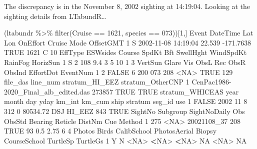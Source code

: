 \documentclass[
]{book}
\newenvironment{Shaded}{\begin{snugshade}}{\end{snugshade}}
\newcommand{\ConstantTok}[1]{\textcolor[rgb]{0.00,0.00,0.00}{#1}}
\newcommand{\DecValTok}[1]{\textcolor[rgb]{0.00,0.00,0.81}{#1}}
\newcommand{\ErrorTok}[1]{\textcolor[rgb]{0.64,0.00,0.00}{\textbf{#1}}}
\newcommand{\FloatTok}[1]{\textcolor[rgb]{0.00,0.00,0.81}{#1}}
\newcommand{\FunctionTok}[1]{\textcolor[rgb]{0.00,0.00,0.00}{#1}}
\newcommand{\NormalTok}[1]{#1}
\newcommand{\SpecialCharTok}[1]{\textcolor[rgb]{0.00,0.00,0.00}{#1}}
\newcommand{\StringTok}[1]{\textcolor[rgb]{0.31,0.60,0.02}{#1}}
\begin{document}
The discrepancy is in the November 8, 2002 sighting at 14:19:04. Looking at the sighting details from LTabundR\ldots{}

\begin{Shaded}
\begin{Highlighting}[]
\NormalTok{(ltabundr }\SpecialCharTok{\%\textgreater{}\%} \FunctionTok{filter}\NormalTok{(Cruise }\SpecialCharTok{==} \DecValTok{1621}\NormalTok{, species }\SpecialCharTok{==} \StringTok{\textquotesingle{}073\textquotesingle{}}\NormalTok{))[}\DecValTok{1}\NormalTok{,]}
\NormalTok{  Event            DateTime    Lat       Lon OnEffort Cruise Mode OffsetGMT}
\DecValTok{1}\NormalTok{     S }\DecValTok{2002{-}11{-}08} \DecValTok{14}\SpecialCharTok{:}\DecValTok{19}\SpecialCharTok{:}\DecValTok{04} \FloatTok{22.539} \SpecialCharTok{{-}}\FloatTok{171.7638}     \ConstantTok{TRUE}   \DecValTok{1621}\NormalTok{    C        }\DecValTok{10}
\NormalTok{  EffType ESWsides Course SpdKt Bft SwellHght WindSpdKt RainFog HorizSun}
\DecValTok{1}\NormalTok{       S        }\DecValTok{2}    \DecValTok{108}   \FloatTok{9.4}   \DecValTok{3}         \DecValTok{5}        \DecValTok{10}       \DecValTok{1}        \DecValTok{3}
\NormalTok{  VertSun Glare Vis ObsL Rec ObsR ObsInd EffortDot EventNum}
\DecValTok{1}       \DecValTok{2} \ConstantTok{FALSE}   \DecValTok{6}  \DecValTok{200} \DecValTok{073}  \DecValTok{208}   \SpecialCharTok{\textless{}}\ConstantTok{NA}\SpecialCharTok{\textgreater{}}      \ConstantTok{TRUE}      \DecValTok{129}
\NormalTok{                              file\_das line\_num stratum\_HI\_EEZ stratum\_OtherCNP}
\DecValTok{1}\NormalTok{ CenPac1986}\SpecialCharTok{{-}}\NormalTok{2020\_Final\_alb\_edited.das   }\DecValTok{273857}           \ConstantTok{TRUE}             \ConstantTok{TRUE}
\NormalTok{  stratum\_WHICEAS year month day yday km\_int   km\_cum ship stratum seg\_id  use}
\DecValTok{1}           \ConstantTok{FALSE} \DecValTok{2002}    \DecValTok{11}   \DecValTok{8}  \DecValTok{312}      \DecValTok{0} \FloatTok{80534.72}\NormalTok{  DSJ  HI\_EEZ    }\DecValTok{843} \ConstantTok{TRUE}
\NormalTok{  SightNo Subgroup SightNoDaily Obs ObsStd Bearing Reticle DistNm Cue Method}
\DecValTok{1}     \DecValTok{275}     \SpecialCharTok{\textless{}}\ConstantTok{NA}\SpecialCharTok{\textgreater{}}\NormalTok{  20021108\_37 }\DecValTok{208}   \ConstantTok{TRUE}      \DecValTok{93}     \FloatTok{0.5}   \FloatTok{2.75}   \DecValTok{6}      \DecValTok{4}
\NormalTok{  Photos Birds CalibSchool PhotosAerial Biopsy CourseSchool TurtleSp TurtleGs}
\DecValTok{1}\NormalTok{      Y     N        }\SpecialCharTok{\textless{}}\ConstantTok{NA}\SpecialCharTok{\textgreater{}}         \ErrorTok{\textless{}}\ConstantTok{NA}\SpecialCharTok{\textgreater{}}   \ErrorTok{\textless{}}\ConstantTok{NA}\SpecialCharTok{\textgreater{}}           \ConstantTok{NA}     \SpecialCharTok{\textless{}}\ConstantTok{NA}\SpecialCharTok{\textgreater{}}       \ConstantTok{NA}

\end{Highlighting}
\end{Shaded}
\end{document}
